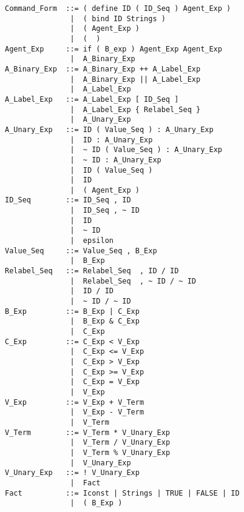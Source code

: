 \footnotesize
  \begin{verbatim}
Command_Form  ::= ( define ID ( ID_Seq ) Agent_Exp )
               |  ( bind ID Strings )
               |  ( Agent_Exp )
               |  (  )
Agent_Exp     ::= if ( B_exp ) Agent_Exp Agent_Exp
               |  A_Binary_Exp
A_Binary_Exp  ::= A_Binary_Exp ++ A_Label_Exp
               |  A_Binary_Exp || A_Label_Exp
               |  A_Label_Exp
A_Label_Exp   ::= A_Label_Exp [ ID_Seq ]
               |  A_Label_Exp { Relabel_Seq }
               |  A_Unary_Exp
A_Unary_Exp   ::= ID ( Value_Seq ) : A_Unary_Exp
               |  ID : A_Unary_Exp
               |  ~ ID ( Value_Seq ) : A_Unary_Exp
               |  ~ ID : A_Unary_Exp
               |  ID ( Value_Seq )
               |  ID
               |  ( Agent_Exp )
ID_Seq        ::= ID_Seq , ID
               |  ID_Seq , ~ ID
               |  ID
               |  ~ ID
               |  epsilon
Value_Seq     ::= Value_Seq , B_Exp
               |  B_Exp
Relabel_Seq   ::= Relabel_Seq  , ID / ID
               |  Relabel_Seq  , ~ ID / ~ ID
               |  ID / ID
               |  ~ ID / ~ ID
B_Exp         ::= B_Exp | C_Exp
               |  B_Exp & C_Exp
               |  C_Exp
C_Exp         ::= C_Exp < V_Exp
               |  C_Exp <= V_Exp
               |  C_Exp > V_Exp
               |  C_Exp >= V_Exp
               |  C_Exp = V_Exp
               |  V_Exp
V_Exp         ::= V_Exp + V_Term
               |  V_Exp - V_Term
               |  V_Term
V_Term        ::= V_Term * V_Unary_Exp
               |  V_Term / V_Unary_Exp
               |  V_Term % V_Unary_Exp
               |  V_Unary_Exp
V_Unary_Exp   ::= ! V_Unary_Exp
               |  Fact
Fact          ::= Iconst | Strings | TRUE | FALSE | ID
               |  ( B_Exp )
  \end{verbatim}
